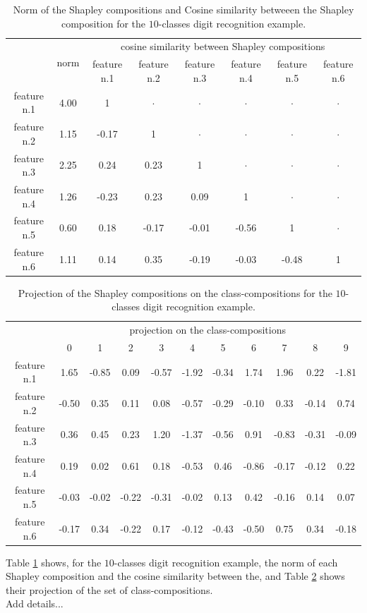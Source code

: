 \documentclass{article}
\theoremstyle{plain}
\theoremstyle{definition}
\theoremstyle{remark}
\begin{document}
\begin{table}
  \centering
  \caption{Norm of the Shapley compositions and Cosine similarity betweeen the Shapley composition for the $10$-classes digit recognition example.}
  \begin{tabular}{c|c|cccccc|}
    \cline{2-8}
    & \multirow{2}{*}{norm} & \multicolumn{6}{c|}{cosine similarity between Shapley compositions} \\
    \cline{3-8}
     & & \small feature n.1 & \small feature n.2 & \small feature n.3 & \small feature n.4 & \small feature n.5 & \small feature n.6 \\
    \hline
    \small feature n.1 & 4.00 & 1 & $\cdot$ & $\cdot$ & $\cdot$ & $\cdot$ & $\cdot$ \\
    \small feature n.2 & 1.15 & -0.17 & 1 & $\cdot$ & $\cdot$ & $\cdot$ & $\cdot$ \\
    \small feature n.3 & 2.25 & 0.24 & 0.23 & 1 & $\cdot$ & $\cdot$ &$\cdot$ \\
    \small feature n.4 & 1.26 & -0.23 & 0.23 & 0.09 & 1 & $\cdot$ & $\cdot$ \\
    \small feature n.5 & 0.60 & 0.18  & -0.17 & -0.01 & -0.56 & 1 & $\cdot$ \\
    \small feature n.6 & 1.11 & 0.14 & 0.35 &	-0.19 & -0.03 & -0.48 & 1 \\
    \hline
  \end{tabular}
  \label{tab:normdigit}
\end{table}

\begin{table}
  \centering
  \caption{Projection of the Shapley compositions on the class-compositions for the $10$-classes digit recognition example.}
  \begin{tabular}{c|cccccccccc|}
    \cline{2-11}
    & \multicolumn{10}{c|}{projection on the class-compositions} \\
    \cline{2-11}
    & 0 & 1 & 2 & 3 & 4 & 5 & 6 & 7 & 8 & 9 \\
    \hline
    \small feature n.1 & 1.65 & -0.85 & 0.09 & -0.57 & -1.92 & -0.34 & 1.74 & 1.96 & 0.22 & -1.81 \\
    \small feature n.2 & -0.50 & 0.35 & 0.11 & 0.08 & -0.57 & -0.29 & -0.10 & 0.33 & -0.14 & 0.74\\
    \small feature n.3 & 0.36 & 0.45 & 0.23 & 1.20 & -1.37 & -0.56 & 0.91 & -0.83 & -0.31 & -0.09 \\
    \small feature n.4 & 0.19 & 0.02 & 0.61 & 0.18 & -0.53 & 0.46 & -0.86 & -0.17 & -0.12 & 0.22 \\
    \small feature n.5 & -0.03 & -0.02 & -0.22 & -0.31 & -0.02 & 0.13 & 0.42 & -0.16& 0.14 & 0.07 \\
    \small feature n.6 & -0.17 & 0.34 & -0.22 & 0.17 & -0.12 & -0.43 &-0.50  & 0.75 & 0.34 & -0.18 \\
    \hline
  \end{tabular}
  \label{tab:projdigit}
\end{table}
Table \ref{tab:normdigit} shows, for the $10$-classes digit recognition example, the norm of each Shapley composition and the cosine similarity between the, and Table \ref{tab:projdigit} shows their projection of the set of class-compositions.\\
Add details...
\end{document}
